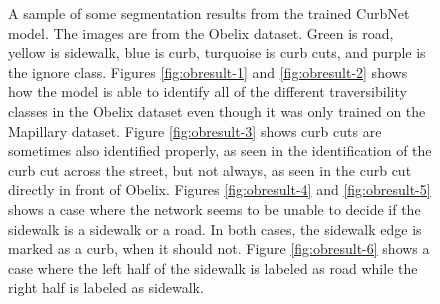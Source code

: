 \begin{figure}
	\caption[Obelix Segmentation Results]{A sample of some segmentation results from the trained CurbNet model. The images are from the Obelix dataset. Green is road, yellow is sidewalk, blue is curb, turquoise is curb cuts, and purple is the ignore class. Figures \ref{fig:obresult-1} and \ref{fig:obresult-2} shows how the model is able to identify all of the different traversibility classes in the Obelix dataset even though it was only trained on the Mapillary dataset. Figure \ref{fig:obresult-3} shows curb cuts are sometimes also identified properly, as seen in the identification of the curb cut across the street, but not always, as seen in the curb cut directly in front of Obelix. Figures \ref{fig:obresult-4} and \ref{fig:obresult-5} shows a case where the network seems to be unable to decide if the sidewalk is a sidewalk or a road. In both cases, the sidewalk edge is marked as a curb, when it should not. Figure \ref{fig:obresult-6} shows a case where the left half of the sidewalk is labeled as road while the right half is labeled as sidewalk.}
	\label{fig:experiments-resultsobelix}
\end{figure}